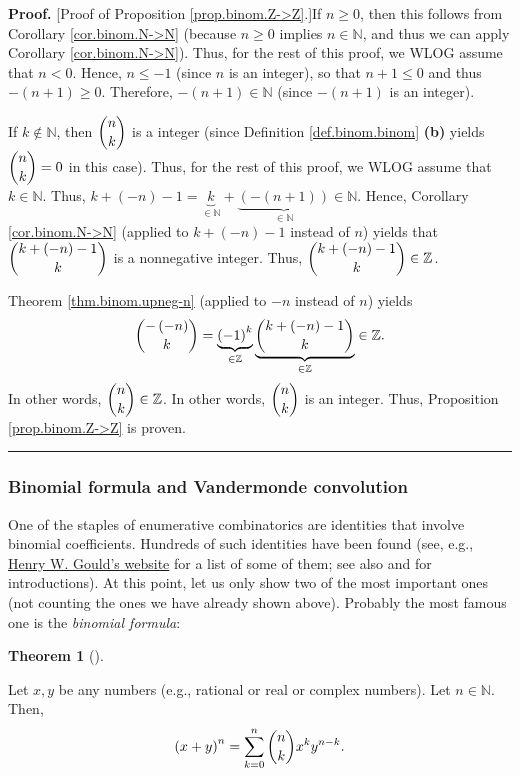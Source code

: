 \documentclass[numbers=enddot,12pt,final,onecolumn,notitlepage]{scrartcl}%
\numberwithin{exer}{subsection}
\theoremstyle{definition}
\newtheorem{theo}{Theorem}[subsection]
\newenvironment{theorem}[1][]
{\begin{theo}[#1]\begin{leftbar}}
{\end{leftbar}\end{theo}}
\newenvironment{proof}[1][Proof]{\noindent\textbf{#1.} }{\ \rule{0.5em}{0.5em}}
\let\sumnonlimits\sum
\renewcommand{\sum}{\sumnonlimits\limits}
\begin{document}
\begin{proof}
[Proof of Proposition \ref{prop.binom.Z->Z}.]If $n\geq0$, then this follows
from Corollary \ref{cor.binom.N->N} (because $n\geq0$ implies $n\in\mathbb{N}%
$, and thus we can apply Corollary \ref{cor.binom.N->N}). Thus, for the rest
of this proof, we WLOG assume that $n<0$. Hence, $n\leq-1$ (since $n$ is an
integer), so that $n+1\leq0$ and thus $-\left(  n+1\right)  \geq0$. Therefore,
$-\left(  n+1\right)  \in\mathbb{N}$ (since $-\left(  n+1\right)  $ is an integer).

If $k\notin\mathbb{N}$, then $\dbinom{n}{k}$ is a integer (since Definition
\ref{def.binom.binom} \textbf{(b)} yields $\dbinom{n}{k}=0$ in this case).
Thus, for the rest of this proof, we WLOG assume that $k\in\mathbb{N}$. Thus,
$k+\left(  -n\right)  -1=\underbrace{k}_{\in\mathbb{N}}+\underbrace{\left(
-\left(  n+1\right)  \right)  }_{\in\mathbb{N}}\in\mathbb{N}$. Hence,
Corollary \ref{cor.binom.N->N} (applied to $k+\left(  -n\right)  -1$ instead
of $n$) yields that $\dbinom{k+\left(  -n\right)  -1}{k}$ is a nonnegative
integer. Thus, $\dbinom{k+\left(  -n\right)  -1}{k}\in\mathbb{Z}$.

Theorem \ref{thm.binom.upneg-n} (applied to $-n$ instead of $n$) yields%
\[
\dbinom{-\left(  -n\right)  }{k}=\underbrace{\left(  -1\right)  ^{k}}%
_{\in\mathbb{Z}}\underbrace{\dbinom{k+\left(  -n\right)  -1}{k}}%
_{\in\mathbb{Z}}\in\mathbb{Z}.
\]
In other words, $\dbinom{n}{k}\in\mathbb{Z}$. In other words, $\dbinom{n}{k}$
is an integer. Thus, Proposition \ref{prop.binom.Z->Z} is proven.
\end{proof}

\subsubsection{Binomial formula and Vandermonde convolution}

One of the staples of enumerative combinatorics are identities that involve
binomial coefficients. Hundreds of such identities have been found (see, e.g.,
\href{http://www.math.wvu.edu/~gould/}{Henry W. Gould's website} for a list of
some of them; see also \cite[Chapter 5]{GKP} and \cite[Chapter 3]{detnotes}
for introductions). At this point, let us only show two of the most important
ones (not counting the ones we have already shown above). Probably the most
famous one is the \textit{binomial formula}:

\begin{theorem}
\label{thm.binom.binf}Let $x,y$ be any numbers (e.g., rational or real or
complex numbers). Let $n\in\mathbb{N}$. Then,%
\[
\left(  x+y\right)  ^{n}=\sum_{k=0}^{n}\dbinom{n}{k}x^{k}y^{n-k}.
\]

\end{theorem}
\end{document}
